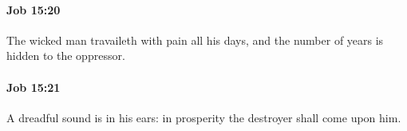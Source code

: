 		\paragraph{Job 15:20} %
			\label{JOB-15-20}

			The wicked man travaileth with pain all his days, and the number of years is hidden to the oppressor.


		\paragraph{Job 15:21} %
			\label{JOB-15-21}

			A dreadful sound is in his ears: in prosperity the destroyer shall come upon him.


